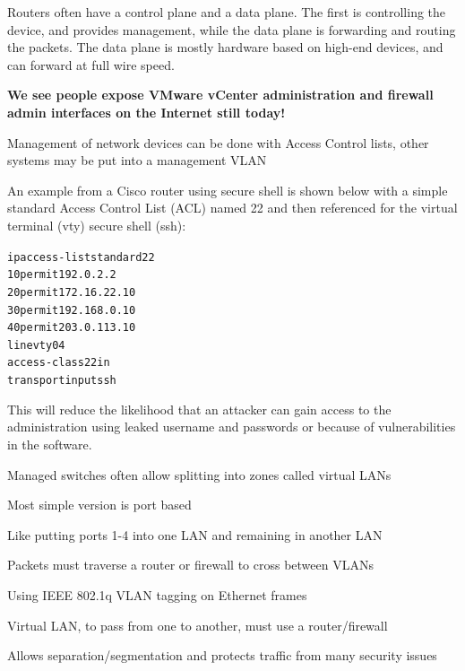 \documentclass[Screen16to9,17pt]{foils}
\begin{document}


Routers often have a control plane and a data plane. The first is controlling the device, and provides management, while the data plane is forwarding and routing the packets. The data plane is mostly hardware based on high-end devices, and can forward at full wire speed.

{\bf We see people expose VMware vCenter administration and firewall admin interfaces on the Internet still today!}



Management of network devices can be done with Access Control lists, other systems may be put into a management VLAN

An example from a Cisco router using secure shell is shown below with a simple standard Access Control List (ACL) named 22 and then referenced for the virtual terminal (vty) secure shell (ssh):

\begin{alltt}\scriptsize
ip access-list standard 22
10 permit 192.0.2.2
20 permit 172.16.22.10
30 permit 192.168.0.10
40 permit 203.0.113.10
line vty 0 4
  access-class 22 in
  transport input ssh
\end{alltt}

This will reduce the likelihood that an attacker can gain access to the administration using leaked username and passwords or because of vulnerabilities in the software.




\begin{list1}
\item Managed switches often allow splitting into zones called virtual LANs
\item Most simple version is port based
\item Like putting ports 1-4 into one LAN and remaining in another LAN
\item Packets must traverse a router or firewall to cross between VLANs
\end{list1}



\begin{list1}
\item Using IEEE 802.1q  VLAN tagging on Ethernet frames
\item Virtual LAN, to pass from one to another, must use a router/firewall
\item Allows separation/segmentation and protects traffic from many security issues
\end{list1}
\end{document}
